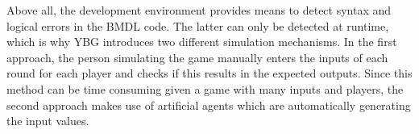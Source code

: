 Above all, the development environment provides means to detect syntax and logical errors in the BMDL code. The latter can only be detected at runtime, which is why YBG introduces two different simulation mechanisms. In the first approach, the person simulating the game manually enters the inputs of each round for each player and checks if this results in the expected outputs. Since this method can be time consuming given a game with many inputs and players, the second approach makes use of artificial agents which are automatically generating the input values.